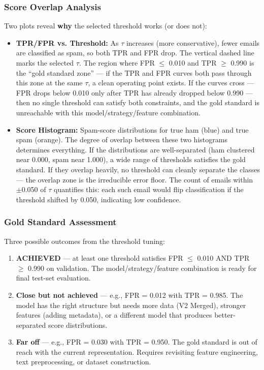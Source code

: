 \subsubsection{Score Overlap Analysis}

Two plots reveal \textbf{why} the selected threshold works (or does not):

\begin{itemize}
  \item \textbf{TPR/FPR vs. Threshold:} As $\tau$ increases (more conservative), fewer emails are classified as spam, so both TPR and FPR drop. The vertical dashed line marks the selected $\tau$. The region where FPR $\le$ 0.010 and TPR $\ge$ 0.990 is the ``gold standard zone'' — if the TPR and FPR curves both pass through this zone at the same $\tau$, a clean operating point exists. If the curves cross — FPR drops below 0.010 only after TPR has already dropped below 0.990 — then no single threshold can satisfy both constraints, and the gold standard is unreachable with this model/strategy/feature combination.
  \item \textbf{Score Histogram:} Spam-score distributions for true ham (blue) and true spam (orange). The degree of overlap between these two histograms determines everything. If the distributions are well-separated (ham clustered near 0.000, spam near 1.000), a wide range of thresholds satisfies the gold standard. If they overlap heavily, no threshold can cleanly separate the classes — the overlap zone is the irreducible error floor. The count of emails within $\pm$0.050 of $\tau$ quantifies this: each such email would flip classification if the threshold shifted by 0.050, indicating low confidence.
\end{itemize}

\subsubsection{Gold Standard Assessment}

Three possible outcomes from the threshold tuning:

\begin{enumerate}
  \item \textbf{ACHIEVED} — at least one threshold satisfies FPR $\le$ 0.010 AND TPR $\ge$ 0.990 on validation. The model/strategy/feature combination is ready for final test-set evaluation.
  \item \textbf{Close but not achieved} — e.g., FPR = 0.012 with TPR = 0.985. The model has the right structure but needs more data (V2 Merged), stronger features (adding metadata), or a different model that produces better-separated score distributions.
  \item \textbf{Far off} — e.g., FPR = 0.030 with TPR = 0.950. The gold standard is out of reach with the current representation. Requires revisiting feature engineering, text preprocessing, or dataset construction.
\end{enumerate}

